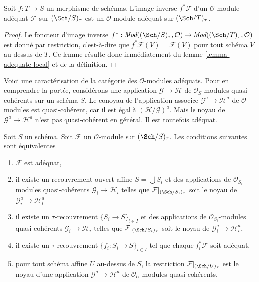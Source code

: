 \begin{lemma}
\label{lemma-pullback-adequate}
Soit $f : T \to S$ un morphisme de schémas.
L'image inverse $f^*\mathcal{F}$ d'un $\mathcal{O}$-module adéquat
$\mathcal{F}$ sur $(\Sch/S)_\tau$ est un
$\mathcal{O}$-module adéquat sur $(\Sch/T)_\tau$.
\end{lemma}

\begin{proof}
Le foncteur d'image inverse
$f^* : \textit{Mod}((\Sch/S)_\tau, \mathcal{O}) \to
\textit{Mod}((\Sch/T)_\tau, \mathcal{O})$
est donné par restriction, c'est-à-dire que $f^*\mathcal{F}(V) = \mathcal{F}(V)$
pour tout schéma $V$ au-dessus de $T$. Ce lemme résulte donc immédiatement du
lemme \ref{lemma-adequate-local}
et de la définition.
\end{proof}

\noindent
Voici une caractérisation de la catégorie des $\mathcal{O}$-modules adéquats.
Pour en comprendre la portée, considérons une application $\mathcal{G} \to \mathcal{H}$
de $\mathcal{O}_S$-modules quasi-cohérents sur un schéma $S$.
Le conoyau de l'application associée $\mathcal{G}^a \to \mathcal{H}^a$
de $\mathcal{O}$-modules est quasi-cohérent, car il est égal à
$(\mathcal{H}/\mathcal{G})^a$. Mais le noyau de
$\mathcal{G}^a \to \mathcal{H}^a$ n'est pas quasi-cohérent
en général. Il est toutefois adéquat.

\begin{lemma}
\label{lemma-adequate-characterize}
Soit $S$ un schéma. Soit $\mathcal{F}$ un $\mathcal{O}$-module sur
$(\Sch/S)_\tau$. Les conditions suivantes sont équivalentes
\begin{enumerate}
\item $\mathcal{F}$ est adéquat,
\item il existe un recouvrement ouvert affine $S = \bigcup S_i$ et des
applications de $\mathcal{O}_{S_i}$-modules quasi-cohérents
$\mathcal{G}_i \to \mathcal{H}_i$
telles que $\mathcal{F}|_{(\Sch/S_i)_\tau}$ soit le
noyau de $\mathcal{G}_i^a \to \mathcal{H}_i^a$
\item il existe un $\tau$-recouvrement $\{S_i \to S\}_{i \in I}$ et des
applications de $\mathcal{O}_{S_i}$-modules quasi-cohérents
$\mathcal{G}_i \to \mathcal{H}_i$
telles que $\mathcal{F}|_{(\Sch/S_i)_\tau}$ soit le
noyau de $\mathcal{G}_i^a \to \mathcal{H}_i^a$,
\item il existe un $\tau$-recouvrement $\{f_i : S_i \to S\}_{i \in I}$
tel que chaque $f_i^*\mathcal{F}$ soit adéquat,
\item pour tout schéma affine $U$ au-dessus de $S$, la restriction
$\mathcal{F}|_{(\Sch/U)_\tau}$ est le noyau
d'une application $\mathcal{G}^a \to \mathcal{H}^a$ de
$\mathcal{O}_U$-modules quasi-cohérents.
\end{enumerate}
\end{lemma}

